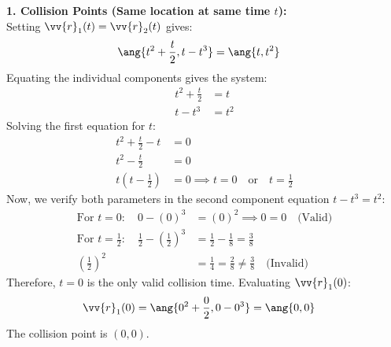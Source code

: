 \begin{sol}
\textbf{1. Collision Points (Same location at same time $t$):} \\
Setting $\vv{r}_1(t) = \vv{r}_2(t)$ gives:
\begin{align*}
\ang{t^2 + \dfrac{t}{2}, t - t^3} &= \ang{t, t^2}
\end{align*}
Equating the individual components gives the system:
\begin{align*}
t^2 + \frac{t}{2} &= t \\
t - t^3 &= t^2
\end{align*}
Solving the first equation for $t$:
\begin{align*}
t^2 + \frac{t}{2} - t &= 0 \\
t^2 - \frac{t}{2} &= 0 \\
t\left(t - \frac{1}{2}\right) &= 0 \implies t = 0 \quad \text{or} \quad t = \frac{1}{2}
\end{align*}
Now, we verify both parameters in the second component equation $t - t^3 = t^2$:
\begin{align*}
\text{For } t = 0: \quad 0 - (0)^3 &= (0)^2 \implies 0 = 0 \quad \text{(Valid)} \\
\text{For } t = \frac{1}{2}: \quad \frac{1}{2} - \left(\frac{1}{2}\right)^3 &= \frac{1}{2} - \frac{1}{8} = \frac{3}{8} \\
\left(\frac{1}{2}\right)^2 &= \frac{1}{4} = \frac{2}{8} \neq \frac{3}{8} \quad \text{(Invalid)}
\end{align*}
Therefore, $t = 0$ is the only valid collision time. Evaluating $\vv{r}_1(0)$:
\begin{align*}
\vv{r}_1(0) &= \ang{0^2 + \frac{0}{2}, 0 - 0^3} = \ang{0, 0}
\end{align*}
The collision point is $(0, 0)$.


\end{sol}
